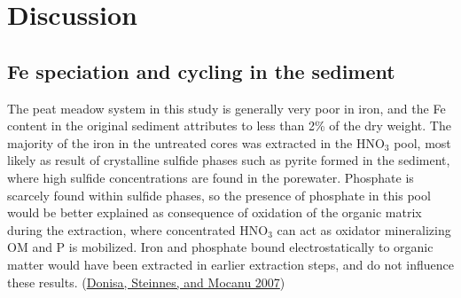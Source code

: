 \documentclass[a4paper,11pt]{article}
\begin{document}
\hypertarget{discussion}{%
\section{Discussion}\label{discussion}}

\hypertarget{fe-speciation-and-cycling-in-the-sediment}{%
\subsection{Fe speciation and cycling in the sediment}\label{fe-speciation-and-cycling-in-the-sediment}}

The peat meadow system in this study is generally very poor in iron, and the Fe content in the original sediment attributes to less than 2\% of the dry weight. The majority of the iron in the untreated cores was extracted in the HNO\(_3\) pool, most likely as result of crystalline sulfide phases such as pyrite formed in the sediment, where high sulfide concentrations are found in the porewater. Phosphate is scarcely found within sulfide phases, so the presence of phosphate in this pool would be better explained as consequence of oxidation of the organic matrix during the extraction, where concentrated HNO\(_3\) can act as oxidator mineralizing OM and P is mobilized. Iron and phosphate bound electrostatically to organic matter would have been extracted in earlier extraction steps, and do not influence these results. (\protect\hyperlink{ref-donisaCombinationDifferentExtractants2007}{Donisa, Steinnes, and Mocanu 2007})
\end{document}
